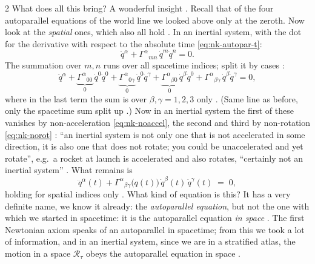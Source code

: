 \begin{paracol}{2}
What does all this bring? A wonderful insight . Recall that of the four autoparallel equations of the world line we looked above only at the zeroth. Now look at the \emph{spatial} ones, which also all hold . In an inertial system, with the dot for the
derivative with respect to the absolute time \eqref{eq:nk-autopar-t}:
\[
  \ddot q^\alpha+\Gamma^\alpha{}_{mn}\,\dot q^m\dot q^n=0 .
\]
The summation over $m,n$ runs over all spacetime indices; split it by cases :
\[
  \ddot q^\alpha
  +\underbrace{\Gamma^\alpha{}_{00}}_{0}\,\dot q^0\dot q^0
  +\underbrace{\Gamma^\alpha{}_{0\gamma}}_{0}\,\dot q^0\dot q^\gamma
  +\underbrace{\Gamma^\alpha{}_{\beta0}}_{0}\,\dot q^\beta\dot q^0
  +\Gamma^\alpha{}_{\beta\gamma}\,\dot q^\beta\dot q^\gamma=0 ,
\]
where in the last term the sum is over $\beta,\gamma=1,2,3$ only . (Same line as before, only the spacetime sum split up .) Now in an inertial system the first of these vanishes by non-acceleration \eqref{eq:nk-noaccel},
the second and third by non-rotation \eqref{eq:nk-norot} : ``an inertial system is not only one that is not accelerated in some direction, it is also one that does not rotate; you could be unaccelerated and yet rotate'', e.g.\ a rocket at launch is accelerated and
also rotates, ``certainly not an inertial system'' . What remains is
\begin{equation}\label{eq:nk-space-autopar}
  \ddot q^\alpha(t)+\Gamma^\alpha{}_{\beta\gamma}\bigl(q(t)\bigr)\,\dot q^\beta(t)\,\dot q^\gamma(t)\;=\;0 ,
\end{equation}
holding for spatial indices only . What kind of equation is this? It has a very definite name, we know it already: the \emph{autoparallel equation}, but not the one with which we started in spacetime: it is the
autoparallel equation \emph{in space} . The first Newtonian axiom speaks of an autoparallel in spacetime; from this we took a lot of information, and in an inertial system, since we are in a stratified atlas, the motion in a space $\mathcal R_\tau$ obeys the autoparallel equation in space
.


\end{paracol}
